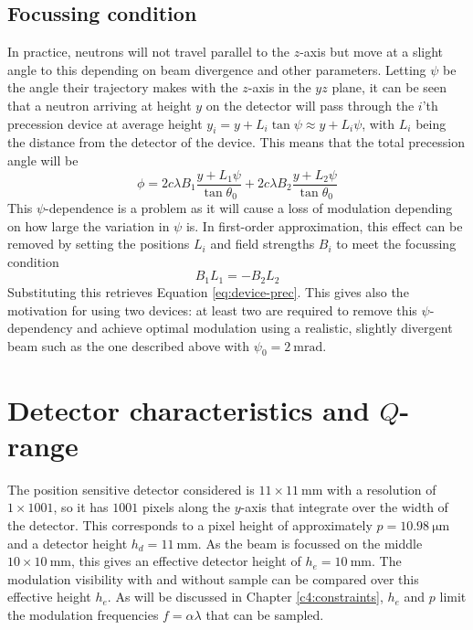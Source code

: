 \subsection{Focussing condition}
In practice, neutrons will not travel parallel to the $z$-axis but move at a slight angle to this depending on beam divergence and other parameters. Letting $\psi$ be the angle their trajectory makes with the $z$-axis in the $yz$ plane, it can be seen that a neutron arriving at height $y$ on the detector will pass through the $i$'th precession device at average height $y_i = y + L_i\tan\psi \approx y + L_i\psi$, with $L_i$ being the distance from the detector of the device. This means that the total precession angle will be
$$\phi = 2c\lambda B_1\frac{y + L_1\psi}{\tan\theta_0} + 2c\lambda B_2\frac{y + L_2\psi}{\tan\theta_0}$$
This $\psi$-dependence is a problem as it will cause a loss of modulation depending on how large the variation in $\psi$ is. In first-order approximation, this effect can be removed by setting the positions $L_i$ and field strengths $B_i$ to meet the focussing condition
$$B_1L_1 = -B_2L_2$$
Substituting this retrieves Equation \eqref{eq:device-prec}. This gives also the motivation for using two devices: at least two are required to remove this $\psi$-dependency and achieve optimal modulation using a realistic, slightly divergent beam such as the one described above with $\psi_0 = \SI{2}{\milli\radian}$.
\section{Detector characteristics and $Q$-range}
\label{c3.4}
The position sensitive detector considered is $11\times11~\unit{\milli\meter}$ with a resolution of $1\times 1001$, so it has $1001$ pixels along the $y$-axis that integrate over the width of the detector. This corresponds to a pixel height of approximately $p = \SI{10.98}{\micro\meter}$ and a detector height $h_d = \SI{11}{\milli\meter}$. As the beam is focussed on the middle $10\times10~\unit{\milli\meter}$, this gives an effective detector height of $h_e = \SI{10}{\milli\meter}$. The modulation visibility with and without sample can be compared over this effective height $h_e$. As will be discussed in Chapter \ref{c4:constraints}, $h_e$ and $p$ limit the modulation frequencies $f = \alpha\lambda$ that can be sampled. 

